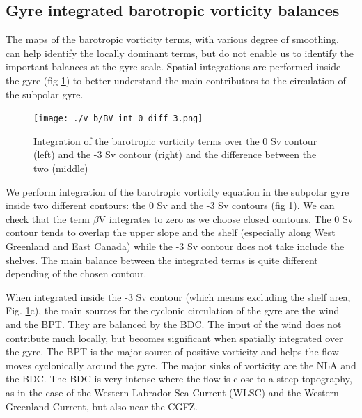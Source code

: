\documentclass[11pt,a4paper]{article}
\begin{document}
\subsection{Gyre integrated barotropic vorticity balances}

The maps of the barotropic vorticity terms, with various degree of smoothing, can help identify the locally dominant terms, but do not enable us to identify the important balances at the gyre scale. Spatial integrations are performed inside the gyre (fig \ref{intgyre_BV}) to better understand the main contributors to the circulation of the subpolar gyre. 


\begin{figure}[H]
\centerline{\texttt{[image: ./v\_b/BV\_int\_0\_diff\_3.png]}}
\caption{Integration of the barotropic vorticity terms over the 0 Sv contour (left) and the -3 Sv contour (right) and the difference between the two (middle)}
\label{intgyre_BV}
\end{figure} 

We perform integration of the barotropic vorticity equation in the subpolar gyre inside two different contours: the 0 Sv and the -3 Sv contours (fig \ref{intgyre_BV}). We can check that the term $\beta$V integrates to zero as we choose closed contours. The 0 Sv contour tends to overlap the upper slope and the shelf (especially along West Greenland and East Canada) while the -3 Sv contour does not take include the shelves. The main balance between the integrated terms is quite different depending of the chosen contour.

When integrated inside the -3 Sv contour (which means excluding the shelf area, Fig. \ref{intgyre_BV}c), the main sources for the cyclonic circulation of the gyre are the wind and the BPT. They are balanced by the BDC. The input of the wind does not contribute much locally, but becomes significant when spatially integrated over the gyre. The BPT is the major source of positive vorticity and helps the flow moves cyclonically around the gyre. The major sinks of vorticity are the NLA and the BDC. The BDC is very intense where the flow is close to a steep topography, as in the case of the Western Labrador Sea Current (WLSC) and the Western Greenland Current, but also near the CGFZ. 
\end{document}
